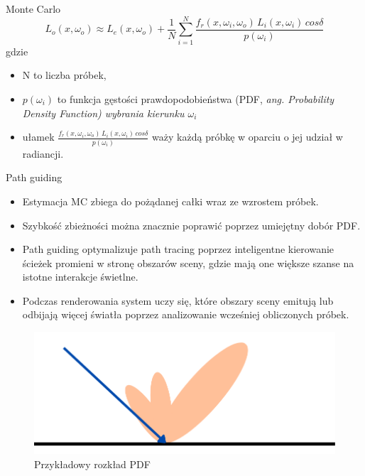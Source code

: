 \documentclass{beamer}
\begin{document}
\begin{frame}{Monte Carlo}
$$L_o(x, \omega_o) \approx L_e(x, \omega_o) + \frac{1}{N} \sum_{i=1}^{N} \frac{f_r(x, \omega_i, \omega_o) \, L_i(x, \omega_i) \, cos\delta}{p(\omega_i)}
$$
gdzie
\begin{itemize}
    \item N to liczba próbek,
    \item $p(\omega_i)$ to funkcja gęstości prawdopodobieństwa (PDF, \it{ang. Probability Density Function}) \normalfont wybrania kierunku $\omega_i$
    \item ułamek $\frac{f_r(x, \omega_i, \omega_o) \, L_i(x, \omega_i) \, cos\delta}{p(\omega_i)}$ waży każdą próbkę w oparciu o jej udział w radiancji.
\end{itemize}
\end{frame}

\begin{frame}{Path guiding}
    \begin{itemize}
        \item Estymacja MC zbiega do pożądanej całki wraz ze wzrostem próbek.
        \item Szybkość zbieżności można znacznie poprawić poprzez umiejętny dobór PDF.
        \item Path guiding optymalizuje path tracing poprzez inteligentne kierowanie ścieżek promieni w stronę obszarów sceny, gdzie mają one większe szanse na istotne interakcje świetlne.
        \item Podczas renderowania system uczy się, które obszary sceny emitują lub odbijają więcej światła poprzez analizowanie wcześniej obliczonych próbek.
    \end{itemize}
\end{frame}

\begin{frame}
\begin{figure}
    \centering
    \includegraphics[width=0.9\linewidth]{img/PDF.png}
    \caption{Przykładowy rozkład PDF}
    \label{fig:enter-label}
\end{figure}
\end{frame}
\end{document}
